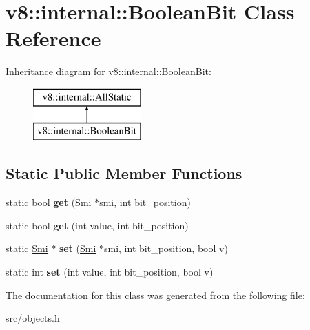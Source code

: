 \hypertarget{classv8_1_1internal_1_1_boolean_bit}{}\section{v8\+:\+:internal\+:\+:Boolean\+Bit Class Reference}
\label{classv8_1_1internal_1_1_boolean_bit}
Inheritance diagram for v8\+:\+:internal\+:\+:Boolean\+Bit\+:\begin{figure}[H]
\begin{center}
\leavevmode
\includegraphics[height=2.000000cm]{classv8_1_1internal_1_1_boolean_bit}
\end{center}
\end{figure}
\subsection*{Static Public Member Functions}
\begin{DoxyCompactItemize}
\item 
\hypertarget{classv8_1_1internal_1_1_boolean_bit_a2d8d2bc008ec849731a3443c44cb9560}{}static bool {\bfseries get} (\hyperlink{classv8_1_1internal_1_1_smi}{Smi} $\ast$smi, int bit\+\_\+position)\label{classv8_1_1internal_1_1_boolean_bit_a2d8d2bc008ec849731a3443c44cb9560}

\item 
\hypertarget{classv8_1_1internal_1_1_boolean_bit_a0021135995e316cd5abd7d024da90f3b}{}static bool {\bfseries get} (int value, int bit\+\_\+position)\label{classv8_1_1internal_1_1_boolean_bit_a0021135995e316cd5abd7d024da90f3b}

\item 
\hypertarget{classv8_1_1internal_1_1_boolean_bit_a67fea84c12d1a39e2dccc59fa59a5d63}{}static \hyperlink{classv8_1_1internal_1_1_smi}{Smi} $\ast$ {\bfseries set} (\hyperlink{classv8_1_1internal_1_1_smi}{Smi} $\ast$smi, int bit\+\_\+position, bool v)\label{classv8_1_1internal_1_1_boolean_bit_a67fea84c12d1a39e2dccc59fa59a5d63}

\item 
\hypertarget{classv8_1_1internal_1_1_boolean_bit_afbfebc642ff88f009b5097ab8374dc64}{}static int {\bfseries set} (int value, int bit\+\_\+position, bool v)\label{classv8_1_1internal_1_1_boolean_bit_afbfebc642ff88f009b5097ab8374dc64}

\end{DoxyCompactItemize}


The documentation for this class was generated from the following file\+:\begin{DoxyCompactItemize}
\item 
src/objects.\+h\end{DoxyCompactItemize}
